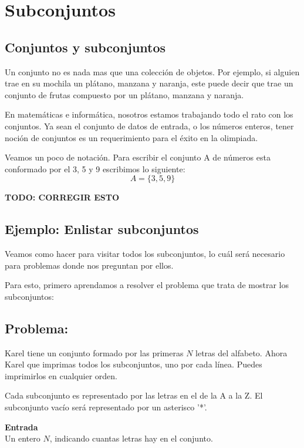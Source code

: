\section{Subconjuntos}

\subsection{Conjuntos y subconjuntos}

Un conjunto no es nada mas que una colección de objetos. Por ejemplo, si alguien trae en su mochila un plátano, manzana y naranja, este puede decir que trae un conjunto de frutas compuesto por un plátano, manzana y naranja.

En matemáticas e informática, nosotros estamos trabajando todo el rato con los conjuntos. Ya sean el conjunto de datos de entrada, o los números enteros, tener noción de conjuntos es un requerimiento para el éxito en la olimpiada.

Veamos un poco de notación. Para escribir el conjunto A de números esta conformado por el 3, 5 y 9 escribimos lo siguiente:
\[A=\{3,5,9\}\]

\begin{center}
	\textbf{TODO: CORREGIR ESTO}
\end{center}
\pagebreak

\subsection*{Ejemplo: Enlistar subconjuntos}
Veamos como hacer para visitar todos los subconjuntos, lo cuál será necesario para problemas donde nos preguntan por ellos.

Para esto, primero aprendamos a resolver el problema que trata de mostrar los subconjuntos:

\subsection*{Problema:}

Karel tiene un conjunto formado por las primeras \(N\) letras del alfabeto. Ahora Karel que imprimas todos los subconjuntos, uno por cada línea. Puedes imprimirlos en cualquier orden.

Cada subconjunto es representado por las letras en el de la A a la Z. El subconjunto vacío será representado por un asterisco '*'.

\textbf{Entrada}\\
Un entero \(N\), indicando cuantas letras hay en el conjunto.

